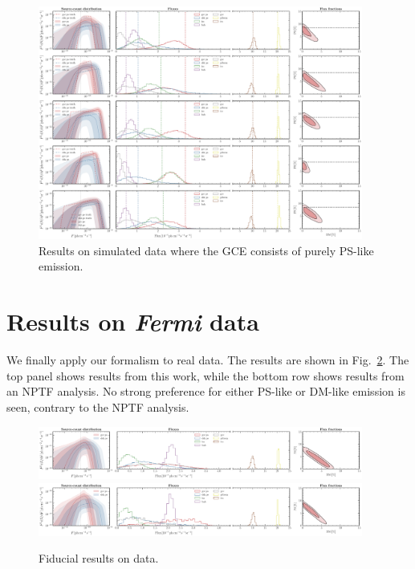 \documentclass[prd,aps,10pt,nofootinbib,twocolumn,superscriptaddress,preprintnumbers,balancelastpage,longbibliography]{revtex4-1}
\begin{document}
%
\begin{figure}
    \centering
    \includegraphics[width=0.95\textwidth]{plots/sim_sbi_ps.pdf}
    \caption{Results on simulated data where the GCE consists of purely PS-like emission.}
    \label{fig:sim_sbi_ps}
\end{figure}
%

\section{Results on \emph{Fermi} data}
\label{sec:data}

We finally apply our formalism to real \Fermi data. The results are shown in Fig.~\ref{fig:fid_data}. The top panel shows results from this work, while the bottom row shows results from an NPTF analysis. No strong preference for either PS-like or DM-like emission is seen, contrary to the NPTF analysis.

%
\begin{figure}
    \centering
    \includegraphics[width=0.95\textwidth]{plots/data_fid_sbi.pdf}
    \includegraphics[width=0.95\textwidth]{plots/data_fid_nptf.pdf}
    \caption{Fiducial results on data.}
    \label{fig:fid_data}
\end{figure}
%
\end{document}
